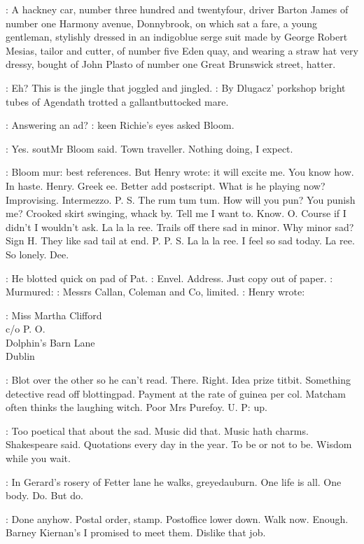 :
A hackney car, number three hundred and twentyfour, driver Barton James of
number one Harmony avenue, Donnybrook, on which sat a fare,
a young gentleman,
stylishly dressed in an indigoblue serge suit made by
George Robert Mesias, tailor and cutter, of number five Eden quay, and
wearing a straw hat very dressy, bought of John Plasto of number one
Great Brunswick street, hatter.

\BloomInt:
Eh? This is the jingle that joggled and jingled.
:
By Dlugacz' porkshop bright tubes of Agendath trotted a
gallantbuttocked mare.

\Goulding:
Answering an ad?
:
keen Richie's eyes asked Bloom.

\Bloom:
Yes.
sout{Mr Bloom said.}
Town traveller. Nothing doing, I expect.

\BloomInt:
Bloom mur: best references. But Henry wrote: it will excite me. You
know how. In haste. Henry. Greek ee. Better add postscript. What is he
playing now? Improvising.
Intermezzo. P. S. The rum tum tum. How will
you pun? You punish me? Crooked skirt swinging, whack by. Tell me I want
to. Know. O. Course if I didn't I wouldn't ask. La la la ree. Trails off
there sad in minor. Why minor sad? Sign H. They like sad tail at end.
P. P. S. La la la ree. I feel so sad today. La ree. So lonely. Dee.

:
He blotted quick on pad of Pat.
\BloomInt:
Envel. Address. Just copy out of paper.
:
Murmured:
\BloomInt:
Messrs Callan, Coleman and Co, limited.
:
Henry wrote:

:
        Miss Martha Clifford\\
            c/o P. O.\\
                Dolphin's Barn Lane\\
                     Dublin

\BloomInt:
Blot over the other so he can't read. There. Right. Idea prize titbit.
Something detective read off blottingpad. Payment at the rate of guinea
per col. Matcham often thinks the laughing witch. Poor Mrs Purefoy. U. P:
up.

\BloomInt:
Too poetical that about the sad. Music did that. Music hath charms.
Shakespeare said. Quotations every day in the year. To be or not to be.
Wisdom while you wait.

\BloomInt:
In Gerard's rosery of Fetter lane he walks, greyedauburn. One life is
all. One body. Do. But do.

\BloomInt:
Done anyhow. Postal order, stamp. Postoffice lower down. Walk
now. Enough.
Barney Kiernan's I promised to meet them. Dislike that job.

